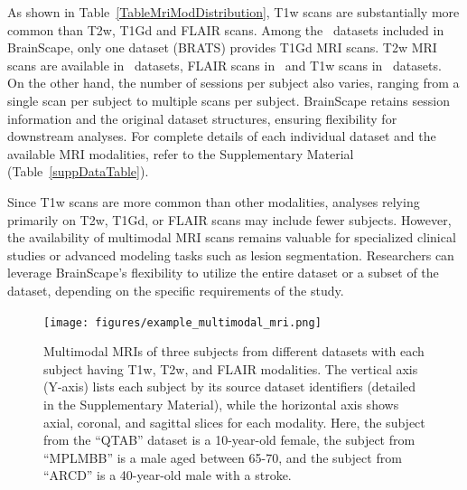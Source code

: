     
As shown in Table~\ref{TableMriModDistribution}, T1w scans are substantially more common than T2w, T1Gd and FLAIR scans.
Among the \NumDatasets\ datasets included in BrainScape, only one dataset (BRATS) provides T1Gd MRI scans. 
T2w MRI scans are available in \NumDatasetsWithTTwoScans\ datasets, 
FLAIR scans in \NumDatasetsWithTFlairScans\, 
and T1w scans in \NumDatasetsWithTToneScans\ datasets.
On the other hand, the number of sessions per subject also varies, 
ranging from a single scan per subject to multiple scans per subject. BrainScape 
retains session information and the original dataset structures, ensuring flexibility 
for downstream analyses. For complete details of each individual dataset and the available
MRI modalities, refer to the Supplementary Material (Table~\ref{suppDataTable}).

Since T1w scans are more common than other modalities, 
analyses relying primarily on T2w, T1Gd, or FLAIR scans may include fewer subjects. 
However, the availability of multimodal MRI scans remains valuable for specialized clinical studies or advanced modeling tasks such as lesion segmentation. 
Researchers can leverage BrainScape's flexibility to utilize the entire dataset or a subset of the dataset, depending on the specific requirements of the study.

\begin{figure}[ht]
    \centering
    \texttt{[image: figures/example\_multimodal\_mri.png]} 
    \caption{
        Multimodal MRIs of three subjects from different datasets with each subject having T1w, T2w, and FLAIR modalities. 
        The vertical axis (Y-axis) lists each subject by its source dataset identifiers (detailed in the Supplementary Material), 
        while the horizontal axis shows axial, coronal, and sagittal slices for each modality. 
        Here, the subject from the ``QTAB'' dataset is a 10-year-old female, 
        the subject from ``MPLMBB'' is a male aged between 65-70, 
        and the subject from ``ARCD'' is a 40-year-old male with a stroke. 
    }
    \label{fig:ExampleMultimodal}
\end{figure}

